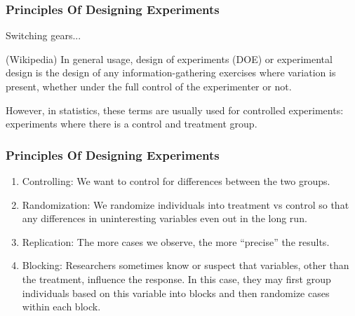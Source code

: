 \documentclass[slides]{beamer}
\newcommand{\blue}[1]{\textcolor{blue2}{#1}}
\begin{document}
\begin{frame}
\frametitle{Principles Of Designing Experiments}

Switching gears...

\vspace{0.5cm}

(Wikipedia) In general usage, \blue{design of experiments (DOE) or experimental design} is the design of any information-gathering exercises where variation is present, whether under the full control of the experimenter or not. 

\vspace{0.5cm}

\pause However, in statistics, these terms are usually used for \blue{controlled experiments}: experiments where there is a control and treatment group.

\end{frame}


\begin{frame}
\frametitle{Principles Of Designing Experiments}

%
%
\begin{enumerate}
\pause\item\blue{Controlling}:  We want to control for differences between the two groups.
\pause\item\blue{Randomization}: We randomize individuals into treatment vs control so that any differences in uninteresting variables even out in the long run.  
\pause\item\blue{Replication}:  The more cases we observe, the more ``precise'' the results.
\pause\item\blue{Blocking}:  Researchers sometimes know or suspect that variables, other than the treatment, influence the response. In this case, they may first group individuals based on this variable into blocks and then randomize cases within each block.  
\end{enumerate}

\end{frame}
\end{document}
